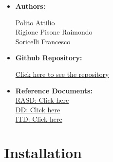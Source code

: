 \documentclass{Configuration_Files/Template}
\begin{document}
\begin{itemize}

    \item \textbf{Authors:}
    
    Polito Attilio\\
    Rigione Pisone Raimondo\\
    Soricelli Francesco\\
    
    \item \textbf{Github Repository:}
    
    \href{https://github.com/Attilioap/PolitoRigionePisoneSoricelli}{Click here to see the repository}\\
    
    \item \textbf{Reference Documents:}\\
    \href{https://github.com/Attilioap/PolitoRigionePisoneSoricelli/blob/main/DeliveryFolder/RASDV2.pdf}{RASD: Click here}\\
    \href{https://github.com/Attilioap/PolitoRigionePisoneSoricelli/blob/main/DeliveryFolder/DDV2.pdf}{DD: Click here}\\
    \href{https://github.com/Attilioap/PolitoRigionePisoneSoricelli/blob/main/DeliveryFolder/ITD1.pdf}{ITD: Click here}\\
    
\end{itemize}

\chapter{Installation}
\end{document}
